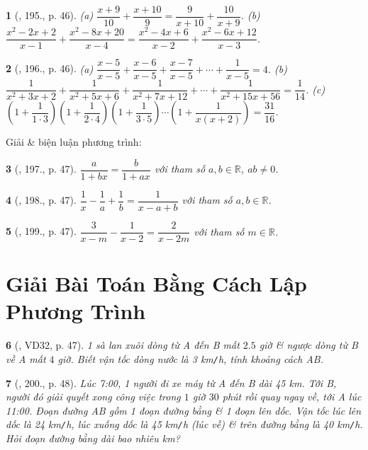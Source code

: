 \documentclass{article}
\newtheorem{baitoan}{}
\begin{document}
\begin{baitoan}[\cite{Tuyen_Toan_8}, 195., p. 46]
	(a) $\dfrac{x + 9}{10} + \dfrac{x + 10}{9} = \dfrac{9}{x + 10} + \dfrac{10}{x + 9}$. (b) $\dfrac{x^2 - 2x + 2}{x - 1} + \dfrac{x^2 - 8x + 20}{x - 4} = \dfrac{x^2 - 4x + 6}{x - 2} + \dfrac{x^2 - 6x + 12}{x - 3}$.
\end{baitoan}

\begin{baitoan}[\cite{Tuyen_Toan_8}, 196., p. 46]
	(a) $\dfrac{x - 5}{x - 5} + \dfrac{x - 6}{x - 5} + \dfrac{x - 7}{x - 5} + \cdots + \dfrac{1}{x - 5} = 4$. (b) $\dfrac{1}{x^2 + 3x + 2} + \dfrac{1}{x^2 + 5x + 6} + \dfrac{1}{x^2 + 7x + 12} + \cdots + \dfrac{1}{x^2 + 15x + 56} = \dfrac{1}{14}$. (c) $\left(1 + \dfrac{1}{1\cdot3}\right)\left(1 + \dfrac{1}{2\cdot4}\right)\left(1 + \dfrac{1}{3\cdot5}\right)\cdots\left(1 + \dfrac{1}{x(x + 2)}\right) = \dfrac{31}{16}$.
\end{baitoan}
Giải \& biện luận phương trình:

\begin{baitoan}[\cite{Tuyen_Toan_8}, 197., p. 47]
	$\dfrac{a}{1 + bx} = \dfrac{b}{1 + ax}$ với tham số $a,b\in\mathbb{R}$, $ab\ne0$.
\end{baitoan}

\begin{baitoan}[\cite{Tuyen_Toan_8}, 198., p. 47]
	$\dfrac{1}{x} - \dfrac{1}{a} + \dfrac{1}{b} = \dfrac{1}{x - a + b}$ với tham số $a,b\in\mathbb{R}$.
\end{baitoan}

\begin{baitoan}[\cite{Tuyen_Toan_8}, 199., p. 47]
	$\dfrac{3}{x - m} - \dfrac{1}{x - 2} = \dfrac{2}{x - 2m}$ với tham số $m\in\mathbb{R}$.
\end{baitoan}


\section{Giải Bài Toán Bằng Cách Lập Phương Trình}

\begin{baitoan}[\cite{Tuyen_Toan_8}, VD32, p. 47]
	1 sà lan xuôi dòng từ A đến B mất $2.5$ giờ \& ngược dòng từ B về A mất $4$ giờ. Biết vận tốc dòng nước là {\rm3 km{\tt/}h}, tính khoảng cách AB.
\end{baitoan}

\begin{baitoan}[\cite{Tuyen_Toan_8}, 200., p. 48]
	Lúc {\rm7:00}, 1 người đi xe máy từ A đến B dài {\rm45 km}. Tới B, người đó giải quyết xong công việc trong $1$ giờ $30$ phút rồi quay ngay về, tới A lúc {\rm11:00}. Đoạn đường AB gồm 1 đoạn đường bằng \& 1 đoạn lên dốc. Vận tốc lúc lên dốc là {\rm24 km{\tt/}h}, lúc xuống dốc là {\rm45 km{\tt/}h} (lúc về) \& trên đường bằng là {\rm40 km{\tt/}h}. Hỏi đoạn đường bằng dài bao nhiêu {\rm km}?
\end{baitoan}
\end{document}
